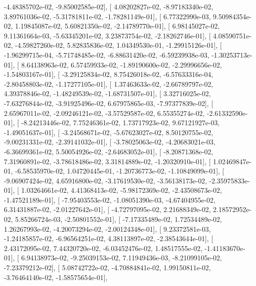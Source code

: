 \documentclass{article}
\begin{document}
         -4.48385702e-02,  -9.85002585e-02],
       [  4.08202827e-02,  -8.97183340e-02,   3.89761036e-02,
         -5.31781811e-02,  -1.78281149e-01],
       [  6.77322990e-03,   9.50984354e-02,   1.19845087e-02,
          5.60821350e-02,  -2.14789770e-01],
       [  6.98145027e-02,   9.11361664e-03,  -5.63345201e-02,
          3.23873754e-02,  -2.18262746e-01],
       [  4.08590751e-02,  -4.59827260e-02,   5.82835836e-02,
          1.04349530e-01,  -1.29915126e-01],
       [ -1.96299715e-04,  -5.71748485e-02,  -6.88631420e-02,
         -6.59239938e-03,  -1.30253713e-01],
       [  8.64138963e-02,   6.57459933e-02,  -1.89190600e-02,
         -2.29996656e-02,  -1.54803167e-01],
       [ -3.29125834e-02,   8.75426018e-02,  -6.57633316e-04,
         -2.80458803e-02,  -1.17277105e-01],
       [  1.37463633e-02,  -2.66789797e-02,   4.39378846e-02,
         -1.48249539e-02,  -1.68731507e-01],
       [  3.32716025e-02,  -7.63276844e-02,  -3.91925496e-02,
          6.67975865e-03,  -7.97377839e-02],
       [  2.65967011e-02,  -2.09246121e-02,  -3.57529587e-02,
          6.55355274e-02,  -2.61332590e-01],
       [ -8.24213446e-02,   7.75246361e-02,   1.73717923e-02,
          9.67121927e-03,  -1.49051637e-01],
       [ -3.24568671e-02,  -5.67623027e-02,   8.50120755e-02,
         -9.00231331e-02,  -2.39141032e-01],
       [ -3.78025063e-02,  -4.20683021e-03,  -6.36699361e-02,
          5.50054926e-02,  -2.64683052e-01],
       [ -8.20871368e-02,   7.31960891e-02,  -3.78618486e-02,
          3.31814889e-02,  -1.20320910e-01],
       [  1.02469847e-01,  -6.58535970e-02,   1.04720445e-01,
         -1.20736773e-02,  -1.10849099e-01],
       [ -9.06907424e-02,   4.65916800e-02,  -3.17619530e-02,
         -3.56138173e-02,  -2.35975833e-01],
       [  1.03264661e-02,   4.41368413e-02,  -5.98172369e-02,
         -2.43508673e-02,  -1.47521189e-01],
       [ -7.95403553e-02,  -1.08051390e-03,  -4.67404955e-02,
          6.31431887e-02,  -2.01227642e-01],
       [ -4.72797095e-02,   2.21688349e-02,   2.18572952e-02,
          5.85266724e-03,  -2.50801552e-01],
       [ -7.17335489e-02,   1.72534489e-02,   1.26267993e-02,
         -4.20073294e-02,  -2.00124348e-01],
       [  9.23372581e-03,  -1.24185857e-02,  -6.96564251e-02,
          4.38113897e-02,  -2.38543644e-01],
       [  2.43172095e-02,   7.44320720e-02,  -6.03452476e-02,
          1.48517555e-02,  -1.41183670e-01],
       [  6.94138973e-02,  -9.25039153e-02,   7.11949436e-03,
         -8.21099105e-02,  -7.23379212e-02],
       [  5.08742722e-02,  -4.70884841e-02,   1.99150811e-02,
         -3.76464140e-02,  -1.58575654e-01],
\end{document}
